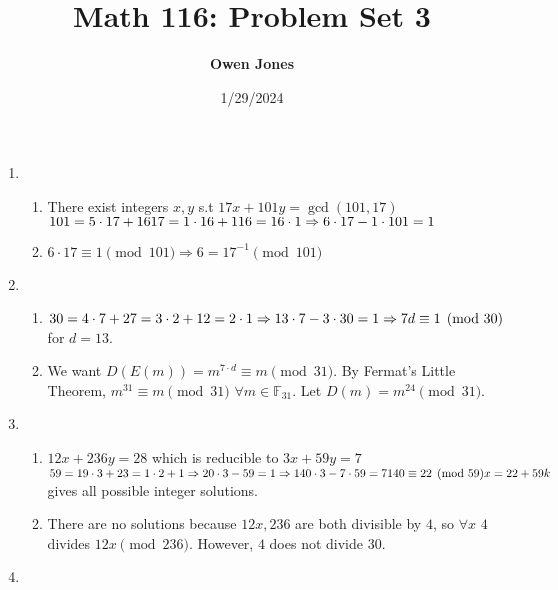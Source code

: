 \documentclass[10pt]{article}
\title{\bf Math 116: Problem Set 3}
\date{1/29/2024}
\author{\bf Owen Jones}
\begin{document}
\maketitle
\begin{enumerate}[label= \arabic*.]
    \item \begin{enumerate}
        \item There exist integers $x,y$ s.t $17x+101y=\gcd(101,17)$\\
        $101=5\cdot 17+16\\
        17=1\cdot 16+1\\
        16=16\cdot 1\\
        \Rightarrow 6\cdot 17-1\cdot 101=1$
        \item $6\cdot 17\equiv 1\pmod {101}\Rightarrow 6={17}^{-1}\pmod {101}$
    \end{enumerate}
    \item \begin{enumerate}
        \item $30=4\cdot 7+2\\
        7=3\cdot2+1\\
        2=2\cdot1\\
        \Rightarrow 13\cdot 7-3\cdot 30=1\\
        \Rightarrow 7d\equiv 1\pmod{30}$ for $d=13$.
        \item We want $D(E(m))=m^{7\cdot d}\equiv m\pmod{31}$.
        By Fermat's Little Theorem, $m^{31}\equiv m\pmod{31}$ $\forall m\in\mathbb{F}_{31}$.
        Let $D(m)=m^{24}\pmod{31}$.
    \end{enumerate} 
    \item \begin{enumerate}
        \item $12x+236y=28$ which is reducible to $3x+59y=7$\\
        $59=19\cdot 3+2\\
        3=1\cdot 2+1\\
        \Rightarrow 20\cdot 3-59=1\Rightarrow 140\cdot3-7\cdot 59=7\\
        140\equiv 22\pmod{59}\\
        x=22+59k$ gives all possible integer solutions.
        \item There are no solutions because $12x,236$ are both divisible by $4$, so $\forall x$ $4$ divides $12x\pmod{236}$. However, $4$ does not divide $30$.
    \end{enumerate}
    \item \begin{enumerate}

\end{enumerate}
\end{enumerate}
\end{document}
